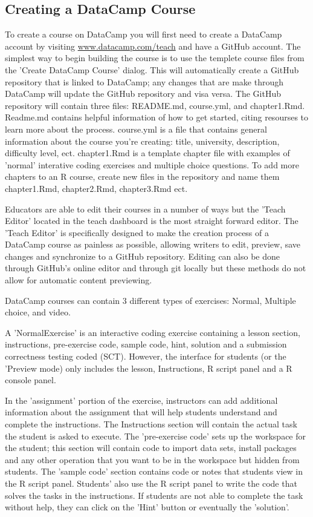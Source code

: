 \documentclass{tise_style}
\begin{document}
\subsection{Creating a DataCamp Course}
To create a course on DataCamp you will first need to create a DataCamp account by visiting \url{www.datacamp.com/teach} and
have a GitHub account. The simplest way to begin building the course is to use the templete course files from the 'Create
DataCamp Course' dialog. This will automatically create a GitHub repository that is linked to DataCamp; any changes that are 
make through DataCamp will update the GitHub repository and visa versa. The GitHub repository will contain three files: 
README.md, course.yml, and chapter1.Rmd.
Readme.md contains helpful information of how to get started, citing resourses to learn more about the process. 
course.yml is a file that contains general information about the course you're creating: title, university, description, 
difficulty level, ect.  
chapter1.Rmd is a template chapter file with examples of 'normal' interative coding exercises and multiple choice questions.
To add more chapters to an R course, create new files in the repository and name them chapter1.Rmd, chapter2.Rmd, chapter3.Rmd
ect.

Educators are able to edit their courses in a number of ways but the 'Teach Editor' located in the teach dashboard is the
most straight forward editor. The 'Teach Editor' is specifically designed to make the creation process of a DataCamp course
as painless as possible, allowing writers to edit, preview, save changes and synchronize to a GitHub repository. Editing can
also be done through GitHub's online editor and through git locally but these methods do not allow for automatic content
previewing.

DataCamp courses can contain 3 different types of exercises: Normal, Multiple choice, and video.

A 'NormalExercise' is an interactive coding exercise containing a lesson section, instructions, pre-exercise code, sample 
code, hint, solution and a submission correctness testing coded (SCT). However, the interface for students (or the 'Preview
mode) only includes the lesson, Instructions, R script panel and a R console panel. 

In the 'assignment' portion of the exercise, instructors can add additional information about the assignment that will help
students understand and complete the instructions. The Instructions section will contain the actual task the student is 
asked to execute. The 'pre-exercise code' sets up the workspace for the student; this section will contain code to import
data sets, install packages and any other operation that you want to be in the workspace but hidden from students. The 'sample
code' section contains code or notes that students view in the R script panel. Students' also use the R script panel to write
the code that solves the tasks in the instructions. If students are not able to complete the task without help, they can click
on the 'Hint' button or eventually the 'solution'. 
\end{document}

